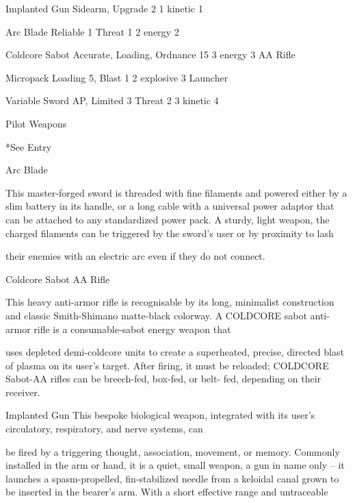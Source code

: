  Implanted Gun          Sidearm, Upgrade                           2                1 kinetic                  1 

 Arc Blade              Reliable 1                                 Threat 1         2 energy                   2 

 Coldcore Sabot         Accurate, Loading, Ordnance                15               3 energy                   3 
 AA Rifle 

 Micropack              Loading                                    5, Blast 1       2 explosive                3 
 Launcher 

  Variable Sword        AP, Limited 3                              Threat 2         3 kinetic                  4 

                                                    Pilot Weapons  

*See Entry
 

Arc Blade  

This master-forged sword is threaded with fine filaments and powered either by a slim battery in its handle,  
or a long cable with a universal power adaptor that can be attached to any standardized power pack. A  
sturdy, light weapon, the charged filaments can be triggered by the sword’s user or by proximity to lash  

their enemies with an electric arc even if they do not connect.
 

Coldcore Sabot AA Rifle  

This heavy anti-armor rifle is recognisable by its long, minimalist construction and classic Smith-Shimano  
matte-black colorway. A COLDCORE sabot anti-armor rifle is a consumable-sabot energy weapon that  

uses depleted demi-coldcore units to create a superheated, precise, directed blast of plasma on its user’s  
target. After firing, it must be reloaded; COLDCORE Sabot-AA rifles can be breech-fed, box-fed, or belt- 
fed, depending on their receiver.   

Implanted Gun  
This bespoke biological weapon, integrated with its user’s circulatory, respiratory, and nerve systems, can  

be fired by a triggering thought, association, movement, or memory. Commonly installed in the arm or  
hand, it is a quiet, small weapon, a gun in name only -- it launches a spasm-propelled, fin-stabilized needle  
from a keloidal canal grown to be inserted in the bearer’s arm. With a short effective range and untraceable  

